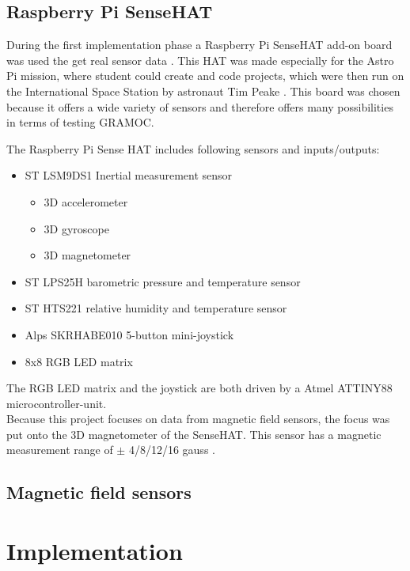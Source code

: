 \subsection{Raspberry Pi SenseHAT}

During the first implementation phase a Raspberry Pi SenseHAT add-on board was used the get real sensor data \cite{SenseHAT}. This HAT was made especially for the Astro Pi mission, where student could create and code projects, which were then run on the International Space Station by astronaut Tim Peake \cite{AstroPiMission}. This board was chosen because it offers a wide variety of sensors and therefore offers many possibilities in terms of testing GRAMOC.

The Raspberry Pi Sense HAT includes following sensors and inputs/outputs:

\begin{itemize}
	\item ST LSM9DS1 Inertial measurement sensor
		\begin{itemize}
			\item 3D accelerometer
			\item 3D gyroscope
			\item 3D magnetometer
		\end{itemize}
	\item ST LPS25H barometric pressure and temperature sensor
	\item ST HTS221 relative humidity and temperature sensor
	\item Alps SKRHABE010 5-button mini-joystick
	\item 8x8 RGB LED matrix
\end{itemize}
\bigskip
The RGB LED matrix and the joystick are both driven by a Atmel ATTINY88 microcontroller-unit.\\
Because this project focuses on data from magnetic field sensors, the focus was put onto the 3D magnetometer of the SenseHAT. This sensor has a magnetic measurement range of $\pm$ 4/8/12/16 gauss \cite{InertialSensorsManual}.

\subsection{Magnetic field sensors}


\section{Implementation}

